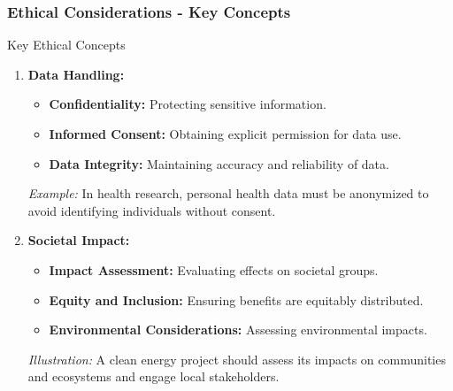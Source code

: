 \documentclass[aspectratio=169]{beamer}
\begin{document}
\begin{frame}[fragile]
    \frametitle{Ethical Considerations - Key Concepts}
    \begin{block}{Key Ethical Concepts}
        \begin{enumerate}
            \item \textbf{Data Handling:}
                \begin{itemize}
                    \item \textbf{Confidentiality:} Protecting sensitive information.
                    \item \textbf{Informed Consent:} Obtaining explicit permission for data use.
                    \item \textbf{Data Integrity:} Maintaining accuracy and reliability of data.
                \end{itemize}
                \textit{Example:} In health research, personal health data must be anonymized to avoid identifying individuals without consent.
            
            \item \textbf{Societal Impact:}
                \begin{itemize}
                    \item \textbf{Impact Assessment:} Evaluating effects on societal groups.
                    \item \textbf{Equity and Inclusion:} Ensuring benefits are equitably distributed.
                    \item \textbf{Environmental Considerations:} Assessing environmental impacts.
                \end{itemize}
                \textit{Illustration:} A clean energy project should assess its impacts on communities and ecosystems and engage local stakeholders.
        \end{enumerate}
    \end{block}
\end{frame}
\end{document}
